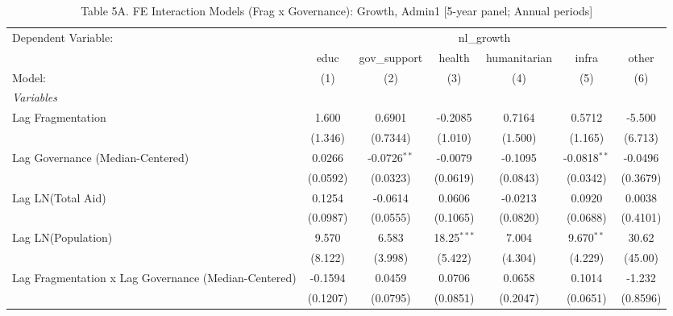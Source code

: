 
\begin{table}[H]
   \caption{Table 5A. FE Interaction Models (Frag x Governance): Growth, Admin1 [5-year panel; Annual periods]}
   \centering
   \begin{tabular}{lcccccc}
      \tabularnewline \midrule \midrule
      Dependent Variable: & \multicolumn{6}{c}{nl\_growth}\\
                                                           & educ     & gov\_support   & health        & humanitarian & infra          & other \\   
      Model:                                               & (1)      & (2)            & (3)           & (4)          & (5)            & (6)\\  
      \midrule
      \emph{Variables}\\
      Lag Fragmentation                                    & 1.600    & 0.6901         & -0.2085       & 0.7164       & 0.5712         & -5.500\\   
                                                           & (1.346)  & (0.7344)       & (1.010)       & (1.500)      & (1.165)        & (6.713)\\   
      Lag Governance (Median-Centered)                     & 0.0266   & -0.0726$^{**}$ & -0.0079       & -0.1095      & -0.0818$^{**}$ & -0.0496\\   
                                                           & (0.0592) & (0.0323)       & (0.0619)      & (0.0843)     & (0.0342)       & (0.3679)\\   
      Lag LN(Total Aid)                                    & 0.1254   & -0.0614        & 0.0606        & -0.0213      & 0.0920         & 0.0038\\   
                                                           & (0.0987) & (0.0555)       & (0.1065)      & (0.0820)     & (0.0688)       & (0.4101)\\   
      Lag LN(Population)                                   & 9.570    & 6.583          & 18.25$^{***}$ & 7.004        & 9.670$^{**}$   & 30.62\\   
                                                           & (8.122)  & (3.998)        & (5.422)       & (4.304)      & (4.229)        & (45.00)\\   
      Lag Fragmentation x Lag Governance (Median-Centered) & -0.1594  & 0.0459         & 0.0706        & 0.0658       & 0.1014         & -1.232\\   
                                                           & (0.1207) & (0.0795)       & (0.0851)      & (0.2047)     & (0.0651)       & (0.8596)\\   

\end{tabular}
\end{table}

